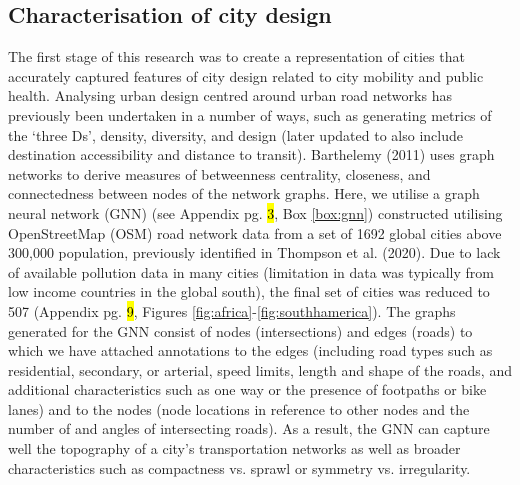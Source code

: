 \documentclass[preprint,10pt]{elsarticle} %
\begin{document}
\subsection*{Characterisation of city design}
The first stage of this research was to create a representation of cities that accurately captured features of city design related to city mobility and public health. Analysing urban design centred around urban road networks has previously been undertaken in a number of ways, such as generating metrics of the `three Ds'\cite{Ewing2010}, density, diversity, and design (later updated to also include destination accessibility and distance to transit). Barthelemy (2011)\cite{Barthelemy2011} uses graph networks to derive measures of betweenness centrality, closeness, and connectedness between nodes of the network graphs. Here, we utilise a graph neural network (GNN) (see Appendix pg. \hl{3}, Box \ref{box:gnn}) constructed utilising OpenStreetMap (OSM) road network data\cite{Boeing2017a} from a set of 1692 global cities above 300,000 population, previously identified in Thompson et al. (2020)\cite{Thompson2020}. Due to lack of available pollution data in many cities (limitation in data was typically from low income countries in the global south), the final set of cities was reduced to 507 (Appendix pg. \hl{9}, Figures \ref{fig:africa}-\ref{fig:southhamerica}). The graphs generated for the GNN consist of nodes (intersections) and edges (roads) to which we have attached annotations to the edges (including road types such as residential, secondary, or arterial, speed limits, length and shape of the roads, and additional characteristics such as one way or the presence of footpaths or bike lanes) and to the nodes (node locations in reference to other nodes and the number of and angles of intersecting roads). As a result, the GNN can capture well the topography of a city's transportation networks as well as broader characteristics such as compactness vs. sprawl or symmetry vs. irregularity.  
\end{document}
